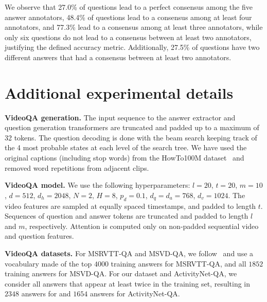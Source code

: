 We observe that 27.0\% of questions lead to a perfect consensus among the five answer annotators, 48.4\% of questions lead to a consensus among at least four annotators, and 77.3\% lead to a consensus among at least three annotators, while only six questions do not lead to a consensus between at least two annotators, justifying the defined accuracy metric. 
Additionally, 27.5\% of questions have two different answers that had a consensus between at least two annotators. 

\section{Additional experimental details}\label{sec:detailsbis}
\noindent \textbf{VideoQA generation.} The input sequence to the answer extractor and question generation transformers are truncated and padded up to a maximum of 32 tokens. 
The question decoding is done with the beam search keeping track of the 4 most probable states at each level of the search tree. 
We have used the original captions (including stop words) from the HowTo100M dataset~\cite{miech19howto100m} and removed word repetitions from adjacent clips.

\noindent \textbf{VideoQA model.} We use the following hyperparameters: $l=20$, $t=20$, $m=10$, $d=512$, $d_h=2048$, $N=2$, $H=8$, $p_d=0.1$, $d_q=d_a=768$, $d_v=1024$.
The video features are sampled at equally spaced timestamps, and padded to length $t$. 
Sequences of question and answer tokens are truncated and padded to length $l$ and $m$, respectively. 
Attention is computed only on non-padded sequential video and question features. 


\noindent \textbf{VideoQA datasets.} For MSRVTT-QA and MSVD-QA, we follow~\cite{le2020hierarchical} and use a vocabulary made of the top $4000$ training answers for MSRVTT-QA, and all $1852$ training answers for MSVD-QA. 
For our \smalldatasetname{} dataset and ActivityNet-QA, we consider all answers that appear at least twice in the training set, resulting in $2348$ answers for \smalldatasetname{} and $1654$ answers for ActivityNet-QA.

